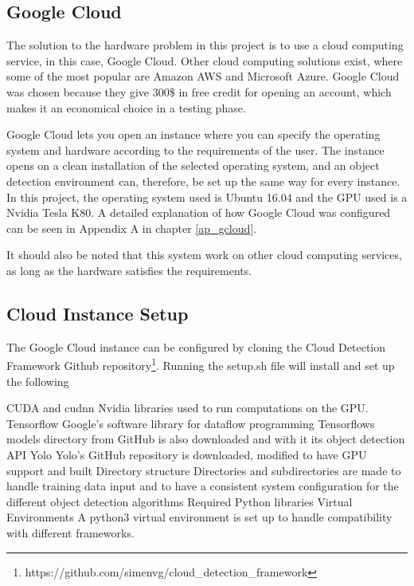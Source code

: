 \subsection{Google Cloud}
The solution to the hardware problem in this project is to use a cloud computing service, in this case, Google Cloud. Other cloud computing solutions exist, where some of the most popular are Amazon AWS and Microsoft Azure. Google Cloud was chosen because they give 300\$ in free credit for opening an account, which makes it an economical choice in a testing phase.

\vspace{3mm}

Google Cloud lets you open an instance where you can specify the operating system and hardware according to the requirements of the user. The instance opens on a clean installation of the selected operating system, and an object detection environment can, therefore, be set up the same way for every instance. In this project, the operating system used is Ubuntu 16.04 and the GPU used is a Nvidia Tesla K80. A detailed explanation of how Google Cloud was configured can be seen in Appendix A in chapter \ref{ap_gcloud}.

\vspace{3mm}

It should also be noted that this system work on other cloud computing services, as long as the hardware satisfies the requirements. 

\subsection{Cloud Instance Setup}
The Google Cloud instance can be configured by cloning the Cloud Detection Framework Github repository\footnote{https://github.com/simenvg/cloud\_detection\_framework}. Running the setup.sh file will install and set up the following 

\begin{outline}
    \1 CUDA and cudnn
       \2 Nvidia libraries used to run computations on the GPU. 
    \1 Tensorflow
       \2 Google's software library for dataflow programming
       \2 Tensorflows models directory from GitHub is also downloaded and with it its object detection API
    \1 Yolo
       \2 Yolo's GitHub repository is downloaded, modified to have GPU support and built
    \1 Directory structure
       \2 Directories and subdirectories are made to handle training data input and to have a consistent system configuration for the different object detection algorithms
    \1 Required Python libraries
    \1 Virtual Environments
       \2 A python3 virtual environment is set up to handle compatibility with different frameworks.
\end{outline}



